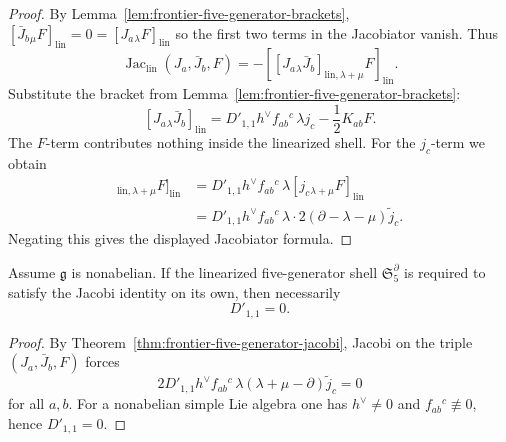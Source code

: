 \begin{proof}
By
Lemma~\ref{lem:frontier-five-generator-brackets},
\([
\bar J_b{}_{\mu}F]_{\mathrm{lin}}=0=[J_a{}_{\lambda}F]_{\mathrm{lin}}
\)
so the first two terms in the Jacobiator vanish.
Thus
\[
\operatorname{Jac}_{\mathrm{lin}}(J_a,\bar J_b,F)
=
-[[J_a{}_{\lambda}\bar J_b]_{\mathrm{lin},\lambda+\mu}F]_{\mathrm{lin}}.
\]
Substitute the bracket from
Lemma~\ref{lem:frontier-five-generator-brackets}:
\[
[J_a{}_{\lambda}\bar J_b]_{\mathrm{lin}}
=
D'_{1,1}h^\vee f_{ab}{}^c\,\lambda j_c
-\frac12 K_{ab}F.
\]
The $F$-term contributes nothing inside the linearized shell.
For the $j_c$-term we obtain
\begin{align*}
[[J_a{}_{\lambda}\bar J_b]_{\mathrm{lin},\lambda+\mu}F]_{\mathrm{lin}}
&=
D'_{1,1}h^\vee f_{ab}{}^c\,\lambda
[j_c{}_{\lambda+\mu}F]_{\mathrm{lin}}
\\
&=
D'_{1,1}h^\vee f_{ab}{}^c\,\lambda\cdot
2(\partial-\lambda-\mu)\widetilde j_c.
\end{align*}
Negating this gives the displayed Jacobiator formula.
\end{proof}

\begin{corollary}
\label{cor:frontier-strict-five-generator-closure-vanishing}
Assume $\mathfrak g$ is nonabelian.
If the linearized five-generator shell $\mathfrak S_5^{\partial}$ is
required to satisfy the Jacobi identity on its own, then necessarily
\[
D'_{1,1}=0.
\]
\end{corollary}

\begin{proof}
By
Theorem~\ref{thm:frontier-five-generator-jacobi},
Jacobi on the triple $(J_a,\bar J_b,F)$ forces
\[
2D'_{1,1}h^\vee f_{ab}{}^c\,
\lambda(\lambda+\mu-\partial)\widetilde j_c=0
\]
for all $a,b$.
For a nonabelian simple Lie algebra one has $h^\vee\neq 0$ and
$f_{ab}{}^c\not\equiv 0$, hence $D'_{1,1}=0$.
\end{proof}

